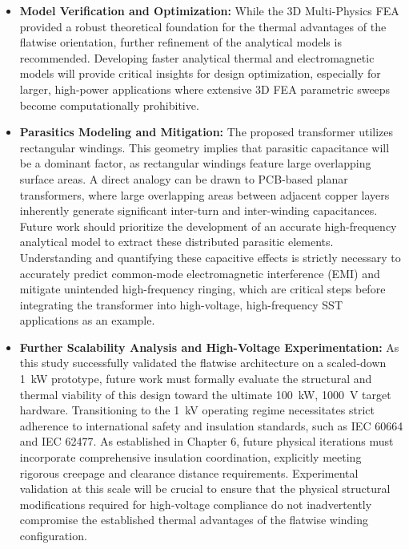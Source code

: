 \begin{itemize}
    \item \textbf{Model Verification and Optimization:} While the 3D Multi-Physics FEA provided a robust theoretical foundation for the thermal advantages of the flatwise orientation, further refinement of the analytical models is recommended. Developing faster analytical thermal and electromagnetic models will provide critical insights for design optimization, especially for larger, high-power applications where extensive 3D FEA parametric sweeps become computationally prohibitive.
    
    \item \textbf{Parasitics Modeling and Mitigation:} The proposed transformer utilizes rectangular windings. This geometry implies that parasitic capacitance will be a dominant factor, as rectangular windings feature large overlapping surface areas. A direct analogy can be drawn to PCB-based planar transformers, where large overlapping areas between adjacent copper layers inherently generate significant inter-turn and inter-winding capacitances. Future work should prioritize the development of an accurate high-frequency analytical model to extract these distributed parasitic elements. Understanding and quantifying these capacitive effects is strictly necessary to accurately predict common-mode electromagnetic interference (EMI) and mitigate unintended high-frequency ringing, which are critical steps before integrating the transformer into high-voltage, high-frequency SST applications as an example.
    
    \item \textbf{Further Scalability Analysis and High-Voltage Experimentation:} As this study successfully validated the flatwise architecture on a scaled-down 1~kW prototype, future work must formally evaluate the structural and thermal viability of this design toward the ultimate 100~kW, 1000~V target hardware. Transitioning to the 1~kV operating regime necessitates strict adherence to international safety and insulation standards, such as IEC 60664 and IEC 62477. As established in Chapter 6, future physical iterations must incorporate comprehensive insulation coordination, explicitly meeting rigorous creepage and clearance distance requirements. Experimental validation at this scale will be crucial to ensure that the physical structural modifications required for high-voltage compliance do not inadvertently compromise the established thermal advantages of the flatwise winding configuration.
\end{itemize}
